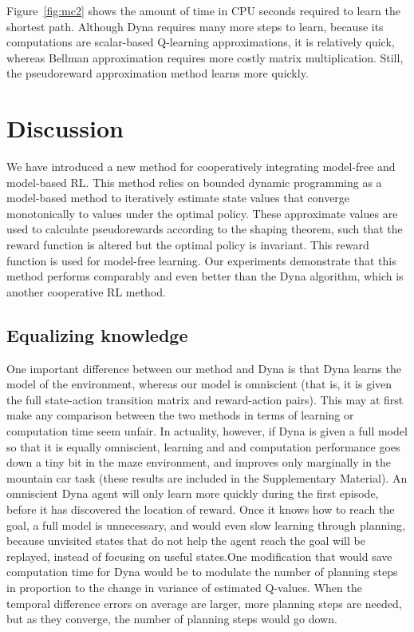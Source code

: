 \documentclass[letterpaper]{article}
\begin{document}
Figure~\ref{fig:mc2} shows the amount of time in CPU seconds required to learn the shortest path. Although Dyna requires many more steps to learn, because its computations are scalar-based Q-learning approximations, it is relatively quick, whereas Bellman approximation requires more costly matrix multiplication. Still, the pseudoreward approximation method learns more quickly.

\section{Discussion}

We have introduced a new method for cooperatively integrating model-free and model-based RL. This method relies on bounded dynamic programming as a model-based method to iteratively estimate state values that converge monotonically to values under the optimal policy. These approximate values are used to calculate pseudorewards according to the shaping theorem, such that the reward function is altered but the optimal policy is invariant. This reward function is used for model-free learning. Our experiments demonstrate that this method performs comparably and even better than the Dyna algorithm, which is another cooperative RL method.

\subsection{Equalizing knowledge}

One important difference between our method and Dyna is that Dyna learns the model of the environment, whereas our model is omniscient (that is, it is given the full state-action transition matrix and reward-action pairs). This may at first make any comparison between the two methods in terms of learning or computation time seem unfair. In actuality, however, if Dyna is given a full model so that it is equally omniscient, learning and and computation performance goes down a tiny bit in the maze environment, and improves only marginally in the mountain car task (these results are included in the Supplementary Material). An omniscient Dyna agent will only learn more quickly during the first episode, before it has discovered the location of reward. Once it knows how to reach the goal, a full model is unnecessary, and would even slow learning through planning, because unvisited states that do not help the agent reach the goal will be replayed, instead of focusing on useful states.One modification that would save computation time for Dyna would be to modulate the number of planning steps in proportion to the change in variance of estimated Q-values. When the temporal difference errors on average are larger, more planning steps are needed, but as they converge, the number of planning steps would go down.
\end{document}

